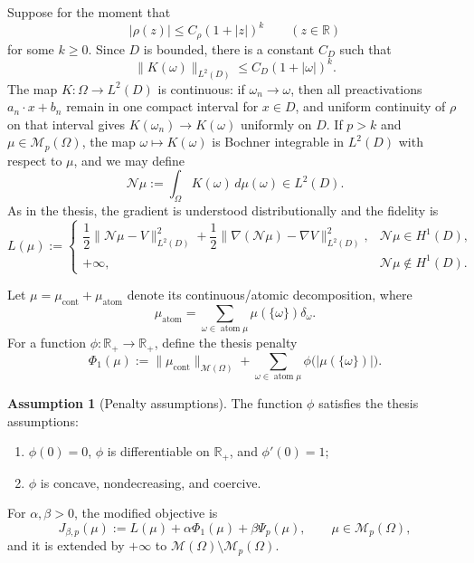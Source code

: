 \documentclass[11pt]{amsart}
\theoremstyle{definition}
\newtheorem{assumption}[theorem]{Assumption}
\theoremstyle{remark}
\DeclareMathOperator{\atom}{atom}
\DeclareMathOperator{\cont}{cont}
\newcommand{\R}{\mathbb{R}}
\newcommand{\M}{\mathcal{M}}
\newcommand{\N}{\mathcal{N}}
\begin{document}
Suppose for the moment that
\begin{equation}
  \label{eq:value-growth}
  |\rho(z)|\leq C_\rho(1+|z|)^k
  \qquad (z\in\R)
\end{equation}
for some $k\geq0$.  Since $D$ is bounded, there is a constant $C_D$ such that
\begin{equation}
  \label{eq:atom-L2-growth}
  \|K(\omega)\|_{L^2(D)}
  \leq C_D(1+|\omega|)^k .
\end{equation}
The map $K:\Omega\to L^2(D)$ is continuous: if $\omega_n\to\omega$, then all
preactivations $a_n\cdot x+b_n$ remain in one compact interval for
$x\in D$, and uniform continuity of $\rho$ on that interval gives
$K(\omega_n)\to K(\omega)$ uniformly on $D$.
If $p>k$ and $\mu\in\M_p(\Omega)$, the map
$\omega\mapsto K(\omega)$ is Bochner integrable in $L^2(D)$ with respect to
$\mu$, and we may define
\[
  \N\mu:=\int_\Omega K(\omega)\,d\mu(\omega)\in L^2(D).
\]
As in the thesis, the gradient is understood distributionally and the fidelity
is
\[
  L(\mu):=
  \begin{cases}
  \dfrac12\|\N\mu-V\|_{L^2(D)}^2
  +\dfrac12\|\nabla(\N\mu)-\nabla V\|_{L^2(D)}^2,
  &\N\mu\in H^1(D),\\[5pt]
  +\infty,&\N\mu\notin H^1(D).
  \end{cases}
\]

Let $\mu=\mu_{\cont}+\mu_{\atom}$ denote its continuous/atomic
decomposition, where
\[
  \mu_{\atom}
  =
  \sum_{\omega\in\atom\mu}\mu(\{\omega\})\delta_\omega.
\]
For a function $\phi:\R_+\to\R_+$, define the thesis penalty
\[
  \Phi_1(\mu)
  :=
  \|\mu_{\cont}\|_{\M(\Omega)}
  +
  \sum_{\omega\in\atom\mu}
  \phi\bigl(|\mu(\{\omega\})|\bigr).
\]

\begin{assumption}[Penalty assumptions]
\label{ass:phi}
The function $\phi$ satisfies the thesis assumptions:
\begin{enumerate}
\item $\phi(0)=0$, $\phi$ is differentiable on $\R_+$, and
      $\phi'(0)=1$;
\item $\phi$ is concave, nondecreasing, and coercive.
\end{enumerate}
\end{assumption}

For $\alpha,\beta>0$, the modified objective is
\begin{equation}
  \label{eq:modified-objective}
  J_{\beta,p}(\mu)
  :=
  L(\mu)+\alpha\Phi_1(\mu)+\beta\Psi_p(\mu),
  \qquad \mu\in\M_p(\Omega),
\end{equation}
and it is extended by $+\infty$ to
$\M(\Omega)\setminus\M_p(\Omega)$.
\end{document}
